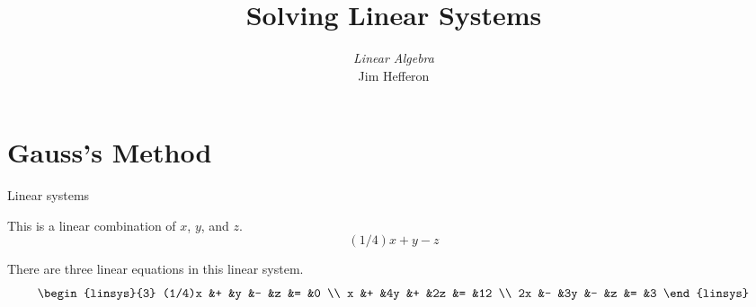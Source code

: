 \documentclass[10pt,t,serif]{beamer} %
\title[Solving Linear Systems] %
{Solving Linear Systems}
\author{\textit{Linear Algebra} \\ {\small Jim Hef{}feron}}
\institute{
  \texttt{http://joshua.smcvt.edu/linearalgebra}
}
\date{}
\begin{document}
\begin{frame}
  \titlepage
\end{frame}




\section{Gauss's Method}
\begin{frame}{Linear systems} 

\ex This is a linear combination of $x$, $y$, and $z$.
\begin{equation*}
   (1/4)x+y-z
\end{equation*}
\end{frame}


\begin{frame}
\ex 
There are three linear equations in this linear system.
\begin{equation*}
  \begin{linsys}{3}
   (1/4)x  &+  &y  &-  &z  &=  &0  \\
        x  &+  &4y &+  &2z &=  &12  \\
       2x  &-  &3y &-  &z  &=  &3  
  \end{linsys}  
\end{equation*}
\end{frame}
\end{document}
